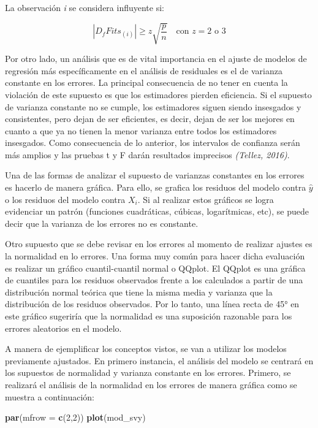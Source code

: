 \documentclass[
  spanish,
  12pt,
]{book}
\newenvironment{Shaded}{\begin{snugshade}}{\end{snugshade}}
\newcommand{\AttributeTok}[1]{\textcolor[rgb]{0.13,0.29,0.53}{#1}}
\newcommand{\DecValTok}[1]{\textcolor[rgb]{0.00,0.00,0.81}{#1}}
\newcommand{\FunctionTok}[1]{\textcolor[rgb]{0.13,0.29,0.53}{\textbf{#1}}}
\newcommand{\NormalTok}[1]{#1}
\begin{document}
La observación \emph{i} se considera influyente si:

\[
|D_f Fits_{(i)}| \geq z\sqrt{\frac{p}{n}} \quad \text{con } z=2 \text{ o } 3
\]

Por otro lado, un análisis que es de vital importancia en el ajuste de modelos de regresión más específicamente en el análisis de residuales es el de varianza constante en los errores. La principal consecuencia de no tener en cuenta la violación de este supuesto es que los estimadores pierden eficiencia. Si el supuesto de varianza constante no se cumple, los estimadores siguen siendo insesgados y consistentes, pero dejan de ser eficientes, es decir, dejan de ser los mejores en cuanto a que ya no tienen la menor varianza entre todos los estimadores insesgados. Como consecuencia de lo anterior, los intervalos de confianza serán más amplios y las pruebas t y F darán resultados imprecisos \emph{(Tellez, 2016)}.

Una de las formas de analizar el supuesto de varianzas constantes en los errores es hacerlo de manera gráfica. Para ello, se grafica los residuos del modelo contra \(\hat{y}\) o los residuos del modelo contra \(X_{i}\). Si al realizar estos gráficos se logra evidenciar un patrón (funciones cuadráticas, cúbicas, logarítmicas, etc), se puede decir que la varianza de los errores no es constante.

Otro supuesto que se debe revisar en los errores al momento de realizar ajustes es la normalidad en lo errores. Una forma muy común para hacer dicha evaluación es realizar un gráfico cuantil-cuantil normal o QQplot. El QQplot es una gráfica de cuantiles para los residuos observados frente a los calculados a partir de una distribución normal teórica que tiene la misma media y varianza que la distribución de los residuos observados. Por lo tanto, una línea recta de 45° en este gráfico sugeriría que la normalidad es una suposición razonable para los errores aleatorios en el modelo.

A manera de ejemplificar los conceptos vistos, se van a utilizar los modelos previamente ajustados. En primero instancia, el análisis del modelo se centrará en los supuestos de normalidad y varianza constante en los errores. Primero, se realizará el análisis de la normalidad en los errores de manera gráfica como se muestra a continuación:

\begin{Shaded}
\begin{Highlighting}[]
\FunctionTok{par}\NormalTok{(}\AttributeTok{mfrow =} \FunctionTok{c}\NormalTok{(}\DecValTok{2}\NormalTok{,}\DecValTok{2}\NormalTok{))}
\FunctionTok{plot}\NormalTok{(mod\_svy)}
\end{Highlighting}
\end{Shaded}
\end{document}
